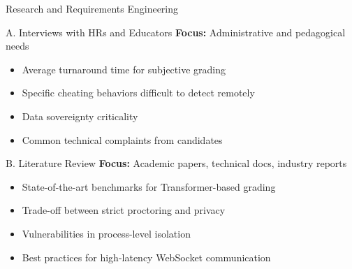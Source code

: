 \begin{frame}{Research and Requirements Engineering}
    \begin{block}{A. Interviews with HRs and Educators}
        \textbf{Focus:} Administrative and pedagogical needs
        \begin{itemize}
            \item Average turnaround time for subjective grading
            \item Specific cheating behaviors difficult to detect remotely
            \item Data sovereignty criticality
            \item Common technical complaints from candidates
        \end{itemize}
    \end{block}
    
    \begin{block}{B. Literature Review}
        \textbf{Focus:} Academic papers, technical docs, industry reports
        \begin{itemize}
            \item State-of-the-art benchmarks for Transformer-based grading
            \item Trade-off between strict proctoring and privacy
            \item Vulnerabilities in process-level isolation
            \item Best practices for high-latency WebSocket communication
        \end{itemize}
    \end{block}
\end{frame}

